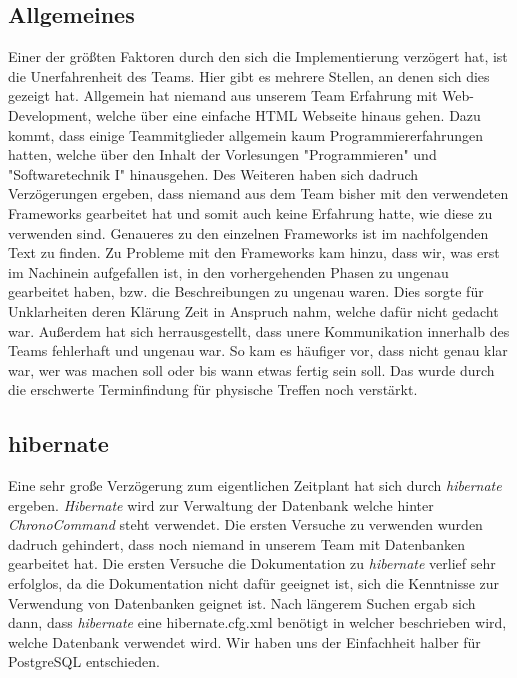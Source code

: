 \subsection{Allgemeines}
Einer der größten Faktoren durch den sich die Implementierung verzögert hat, ist die Unerfahrenheit des Teams. Hier gibt es mehrere Stellen, an denen sich dies gezeigt hat. Allgemein hat niemand aus unserem Team Erfahrung mit Web-Development, welche über eine einfache HTML Webseite hinaus gehen. Dazu kommt, dass einige Teammitglieder allgemein kaum Programmiererfahrungen hatten, welche über den Inhalt der Vorlesungen "Programmieren" und "Softwaretechnik I" hinausgehen. Des Weiteren haben sich dadruch Verzögerungen ergeben, dass niemand aus dem Team bisher mit den verwendeten Frameworks gearbeitet hat und somit auch keine Erfahrung hatte, wie diese zu verwenden sind. Genaueres zu den einzelnen Frameworks ist im nachfolgenden Text zu finden. 
Zu Probleme mit den Frameworks kam hinzu, dass wir, was erst im Nachinein aufgefallen ist, in den vorhergehenden Phasen zu ungenau gearbeitet haben, bzw. die Beschreibungen zu ungenau waren. Dies sorgte für Unklarheiten deren Klärung Zeit in Anspruch nahm, welche dafür nicht gedacht war.
Außerdem hat sich herrausgestellt, dass unere Kommunikation innerhalb des Teams fehlerhaft und ungenau war. So kam es häufiger vor, dass nicht genau klar war, wer was machen soll oder bis wann etwas fertig sein soll. Das wurde durch die erschwerte Terminfindung für physische Treffen noch verstärkt. 





\subsection{hibernate}
Eine sehr große Verzögerung zum eigentlichen Zeitplant hat sich durch \emph{hibernate} ergeben. \emph{Hibernate} wird zur Verwaltung der
Datenbank welche hinter \emph{ChronoCommand} steht verwendet. Die ersten Versuche  zu verwenden wurden dadruch
gehindert, dass noch niemand in unserem Team mit Datenbanken gearbeitet hat. Die ersten Versuche die Dokumentation zu 
\emph{hibernate} verlief sehr erfolglos, da die Dokumentation nicht dafür geeignet ist, sich die Kenntnisse zur Verwendung von
Datenbanken geignet ist. Nach längerem Suchen ergab sich dann, dass \emph{hibernate} eine hibernate.cfg.xml benötigt in welcher 
beschrieben wird, welche Datenbank verwendet wird. Wir haben uns der Einfachheit halber für PostgreSQL entschieden. 


